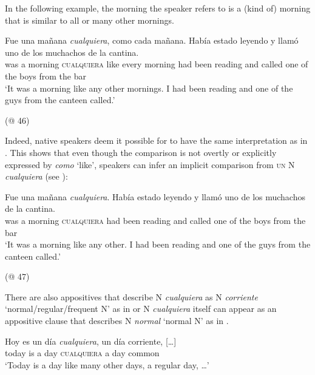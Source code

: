 In the following example, the morning the speaker refers to is a (kind of) morning that is similar to all or many other mornings.

\ea \label{bkm:Ref42870625} %
\gll Fue una mañana \textit{cualquiera}, como cada mañana. Había estado leyendo y llamó uno de los muchachos de la cantina.\\
was a morning \textsc{cualquiera} like every morning had been reading and called one of the boys from the bar\\
\glt ‘It was a morning like any other mornings. I had been reading and one of the guys from the canteen called.’

  (@ 46)
\z

Indeed, native speakers deem it possible for  to have the same interpretation as in . This shows that even though the comparison is not overtly or explicitly expressed by \textit{como} ‘like’, speakers can infer an implicit comparison from \textsc{un} N \textit{cualquiera} (see ): 

\ea \label{bkm:Ref42870616} %
\gll Fue una mañana \textit{cualquiera}. Había estado leyendo y llamó uno de los muchachos de la cantina.\\
was a morning \textsc{cualquiera} had been reading and called one of the boys from the bar\\
\glt ‘It was a morning like any other. I had been reading and one of the guys from the canteen called.’

  (@ 47)
\z

There are also appositives that describe N \textit{cualquiera} as N \textit{corriente} ‘normal/regular/frequent N’ as in  or N \textit{cualquiera} itself can appear as an appositive clause that describes N \textit{normal} ‘normal N’ as in . 

\ea \label{bkm:Ref57554115} %
\gll Hoy es un día \textit{cualquiera}, un día corriente, […]\\
today is a day \textsc{cualquiera} a day common\\
\glt ‘Today is a day like many other days, a regular day, …’

